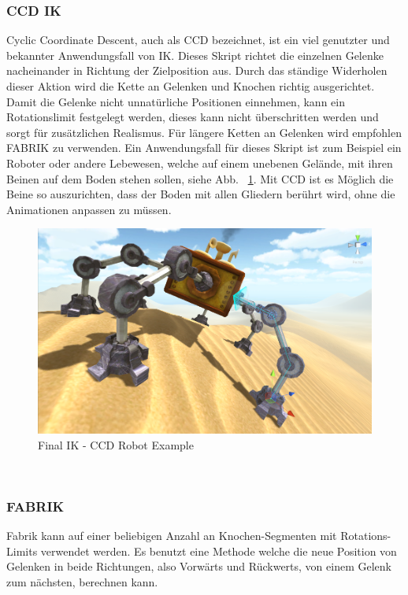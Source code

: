 \begin{itemize}
\subsubsection{CCD IK}
Cyclic Coordinate Descent, auch als CCD bezeichnet, ist ein viel genutzter und bekannter Anwendungsfall von IK.
Dieses Skript richtet die einzelnen Gelenke nacheinander in Richtung der Zielposition aus.
Durch das ständige Widerholen dieser Aktion wird die Kette an Gelenken und Knochen richtig ausgerichtet.
Damit die Gelenke nicht unnatürliche Positionen einnehmen, kann ein Rotationslimit festgelegt werden, dieses kann nicht überschritten werden und sorgt für zusätzlichen Realismus.
Für längere Ketten an Gelenken wird empfohlen FABRIK zu verwenden.
Ein Anwendungsfall für dieses Skript ist zum Beispiel ein Roboter oder andere Lebewesen, welche auf einem unebenen Gelände, mit ihren Beinen auf dem Boden stehen sollen, siehe Abb. ~\ref{fig:finalIK_ccd_robot_example}.
Mit CCD ist es Möglich die Beine so auszurichten, dass der Boden mit allen Gliedern berührt wird, ohne die Animationen anpassen zu müssen.
\begin {figure}
    \centering
    \includegraphics[scale=0.4]{pics/finalik_ccd}
    \caption{Final IK - CCD Robot Example}
    \label{fig:finalIK_ccd_robot_example}
\end {figure}
~\cite{FinalIK_CCD_2021}

\subsubsection{FABRIK}
Fabrik kann auf einer beliebigen Anzahl an Knochen-Segmenten mit Rotations-Limits verwendet werden.
Es benutzt eine Methode welche die neue Position von Gelenken in beide Richtungen, also Vorwärts und Rückwerts,
von einem Gelenk zum nächsten, berechnen kann.


\end{itemize}

